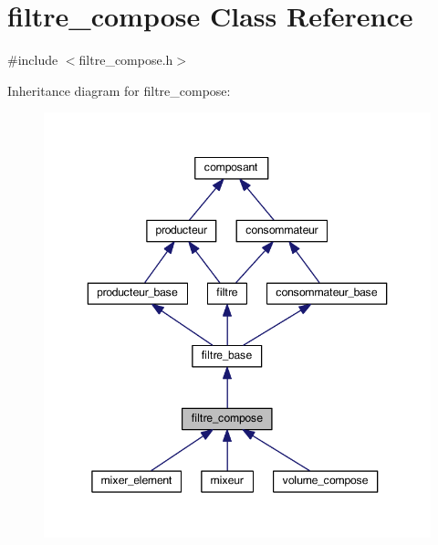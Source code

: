 \hypertarget{classfiltre__compose}{\section{filtre\-\_\-compose Class Reference}
\label{classfiltre__compose}
}


{\ttfamily \#include $<$filtre\-\_\-compose.\-h$>$}



Inheritance diagram for filtre\-\_\-compose\-:
\nopagebreak
\begin{figure}[H]
\begin{center}
\leavevmode
\includegraphics[width=346pt]{classfiltre__compose__inherit__graph}
\end{center}
\end{figure}


